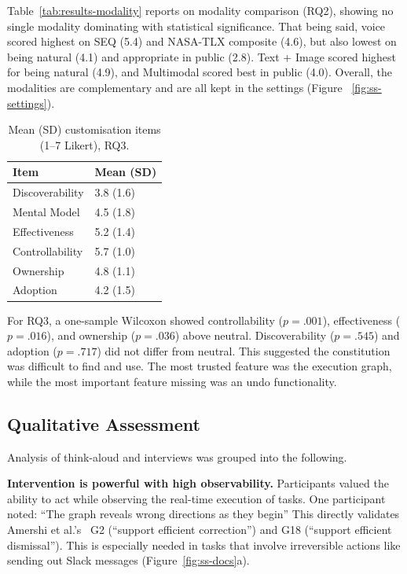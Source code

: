 \documentclass[sigconf, anonymous]{acmart}
\begin{document}
Table~\ref{tab:results-modality} reports on modality comparison (RQ2), showing no single modality dominating with statistical significance. That being said, voice scored highest on SEQ (5.4) and NASA-TLX composite (4.6), but also lowest on being natural (4.1) and appropriate in public (2.8). Text + Image scored highest for being natural (4.9), and Multimodal scored best in public (4.0). Overall, the modalities are complementary and are all kept in the settings (Figure ~\ref{fig:ss-settings}).

\begin{table}[h]
  \caption{Mean (SD) customisation items (1--7 Likert), RQ3.}
  \label{tab:results-rq3}
  \small
  \begin{tabular}{p{} p{}}
    \toprule
    Item & Mean (SD) \\
    \midrule
    Discoverability      & 3.8 (1.6) \\
    Mental Model         & 4.5 (1.8) \\
    Effectiveness        & 5.2 (1.4) \\
    Controllability      & 5.7 (1.0) \\
    Ownership            & 4.8 (1.1) \\
    Adoption             & 4.2 (1.5) \\
    \bottomrule
  \end{tabular}
\end{table}
For RQ3, a one-sample Wilcoxon showed controllability ($p=.001$), effectiveness ($p=.016$), and ownership ($p=.036$) above neutral. Discoverability ($p=.545$) and adoption ($p=.717$) did not differ from neutral. This suggested the constitution was difficult to find and use. The most trusted feature was the execution graph, while the most important feature missing was an undo functionality.

\subsection{Qualitative Assessment}

Analysis of think-aloud and interviews was grouped into the following.

\textbf{Intervention is powerful with high observability.}
Participants valued the ability to act while observing the real-time execution of tasks. One participant noted: “The graph reveals wrong directions as they begin'' This directly validates Amershi et al.'s~\cite{amershi2019guidelines} G2 (``support efficient correction'') and G18 (``support efficient dismissal''). This is especially needed in tasks that involve irreversible actions like sending out Slack messages (Figure~\ref{fig:ss-docs}a).
\end{document}
